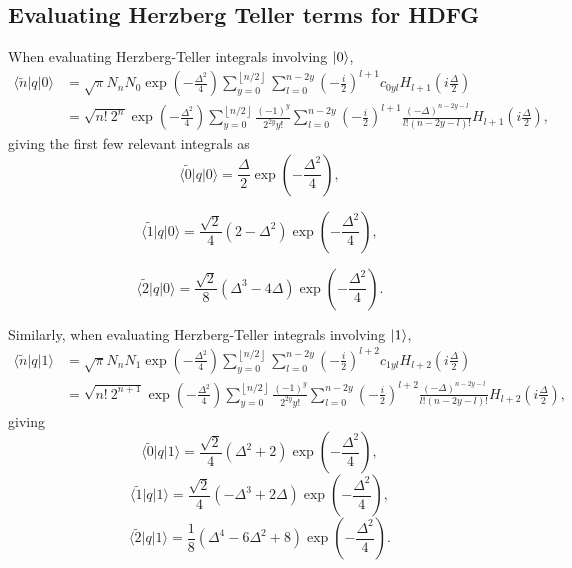 \documentclass[aip, jcp, reprint, onecolumn, nofootinbib]{revtex4-2}
\begin{document}
\subsection{Evaluating Herzberg Teller terms for HDFG}
When evaluating Herzberg-Teller integrals involving $\ket{0}$,
\begin{equation}
\begin{split}
	\langle \tilde{n} |q| 0 \rangle &= 
	\sqrt{\pi} N_n N_0 \exp(-\frac{\Delta^2}{4}) \sum_{y=0}^{\left\lfloor{n/2}\right\rfloor} \sum_{l=0}^{n-2y} \left( -\frac{i}{2} \right)^{l+1} c_{0yl} H_{l+1}\left(i\frac{\Delta}{2}\right) \\
	&= \sqrt{n! \ 2^n} \exp(-\frac{\Delta^2}{4})
	\sum_{y=0}^{\left\lfloor{n/2}\right\rfloor} 
	\frac{(-1)^y}{2^{2y}y!}
	\sum_{l=0}^{n-2y} \left( -\frac{i}{2} \right)^{l+1} 
	\frac{\left(-\Delta\right)^{n-2y-l}}{l!(n-2y-l)!}
	H_{l+1}\left(i\frac{\Delta}{2}\right),
\end{split}
\end{equation}
giving the first few relevant integrals as
\begin{equation}
	\langle \tilde{0} |q| 0 \rangle = \frac{\Delta}{2} \exp(-\frac{\Delta^2}{4}),
\end{equation}

\begin{equation}
	\langle \tilde{1} |q| 0 \rangle = 
	\frac{\sqrt{2}}{4} \left( 2 - \Delta^2 \right)
	\exp(-\frac{\Delta^2}{4}),
\end{equation}

\begin{equation}
	\langle \tilde{2} |q| 0 \rangle = 
	\frac{\sqrt{2}}{8} \left( \Delta^3 - 4 \Delta \right)
	\exp(-\frac{\Delta^2}{4}).
\end{equation}

Similarly, when evaluating Herzberg-Teller integrals involving $\ket{1}$, 
\begin{equation}
	\begin{split}
		\langle \tilde{n} |q| 1 \rangle &= \sqrt{\pi} N_n N_1 \exp(-\frac{\Delta^2}{4}) \sum_{y=0}^{\left\lfloor{n/2}\right\rfloor} \sum_{l=0}^{n-2y} \left( -\frac{i}{2} \right)^{l+2} c_{1yl} H_{l+2}\left(i\frac{\Delta}{2}\right) \\
		&= 
		\sqrt{n! \ 2^{n+1}} \exp(-\frac{\Delta^2}{4}) 
		\sum_{y=0}^{\left\lfloor{n/2}\right\rfloor} 
		\frac{(-1)^y}{2^{2y}y!}
		\sum_{l=0}^{n-2y} \left( -\frac{i}{2} \right)^{l+2} 
		\frac{\left(-\Delta\right)^{n-2y-l}}{l!(n-2y-l)!}
		H_{l+2}\left(i\frac{\Delta}{2}\right),
	\end{split}
\end{equation}
giving
\begin{equation}
	\langle \tilde{0} |q| 1 \rangle = \frac{\sqrt{2}}{4}\left( \Delta^2 + 2 \right)
	\exp(-\frac{\Delta^2}{4}),
\end{equation}
\begin{equation}
	\langle \tilde{1} |q| 1 \rangle = \frac{\sqrt{2}}{4}\left( -\Delta^3 + 2\Delta \right)
	\exp(-\frac{\Delta^2}{4}),
\end{equation}
\begin{equation}
	\langle \tilde{2} |q| 1 \rangle = \frac{1}{8} \left( \Delta^4 - 6\Delta^2 + 8 \right)
	\exp(-\frac{\Delta^2}{4}).
\end{equation}
\end{document}

